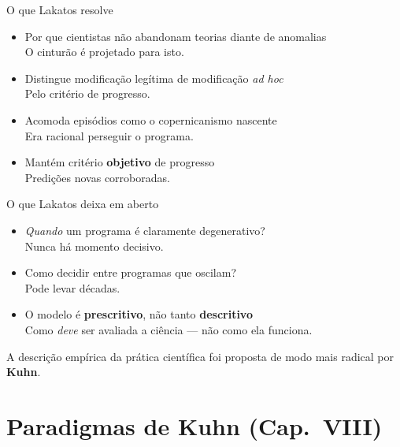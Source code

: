 \documentclass[aspectratio=169]{beamer}
\newcommand{\impt}[1]{\textcolor{maccent}{\textbf{#1}}}
\newcommand{\ntc}[1]{\textcolor{mprimary}{#1}}
\begin{document}
\begin{frame}{O que Lakatos resolve}
\begin{itemize}
  \item Por que cientistas não abandonam teorias diante de anomalias \\
  \ntc{O cinturão é projetado para isto.}
  \pause
  \item Distingue modificação legítima de modificação \emph{ad hoc} \\
  \ntc{Pelo critério de progresso.}
  \pause
  \item Acomoda episódios como o copernicanismo nascente \\
  \ntc{Era racional perseguir o programa.}
  \pause
  \item Mantém critério \impt{objetivo} de progresso \\
  \ntc{Predições novas corroboradas.}
\end{itemize}
\end{frame}

\begin{frame}{O que Lakatos deixa em aberto}
\begin{itemize}
  \item \emph{Quando} um programa é claramente degenerativo? \\
  \ntc{Nunca há momento decisivo.}
  \pause
  \vspace{0.2cm}
  \item Como decidir entre programas que oscilam? \\
  \ntc{Pode levar décadas.}
  \pause
  \vspace{0.2cm}
  \item O modelo é \impt{prescritivo}, não tanto \impt{descritivo} \\
  \ntc{Como \emph{deve} ser avaliada a ciência --- não como ela funciona.}
\end{itemize}
\vspace{0.4cm}
\pause
A descrição empírica da prática científica foi proposta de modo mais radical por \impt{Kuhn}.
\end{frame}

\section{Paradigmas de Kuhn (Cap.~VIII)}
\end{document}
